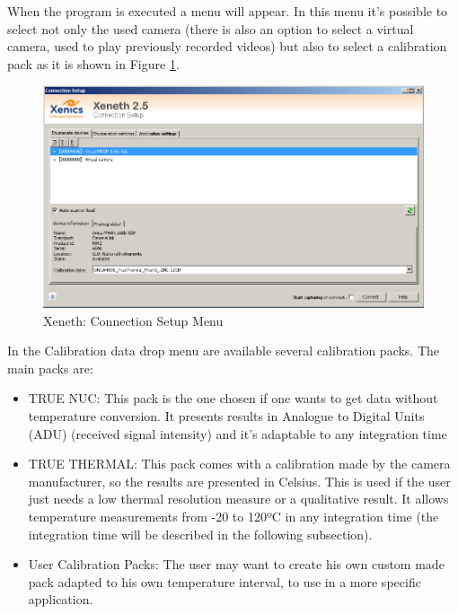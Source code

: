 \par When the program is executed a menu will appear. In this menu it's possible to select not only the used camera (there is also an option to select a virtual camera, used to play previously recorded videos) but also to select a calibration pack as it is shown in Figure \ref{fig:consetup}.
\begin{figure}[h]
\centering
\includegraphics[width=0.7\linewidth]{Figures/3.Chapter/xeneth1.png}
\caption{Xeneth: Connection Setup Menu}
\label{fig:consetup}
\end{figure}
\par In the Calibration data drop menu are available several calibration packs. The main packs are:
\begin{itemize}
\item TRUE NUC: This pack is the one chosen if one wants to get data without temperature conversion. It presents results in Analogue to Digital Units (ADU) (received signal intensity) and it's adaptable to any integration time
\item TRUE THERMAL: This pack comes with a calibration made by the camera manufacturer, so the results are presented in Celsius. This is used if the user just needs a low thermal resolution measure or a qualitative result. It allows temperature measurements from -20 to 120ºC in any integration time (the integration time will be described in the following subsection).
\item User Calibration Packs: The user may want to create his own custom made pack adapted to his own temperature interval, to use in a more specific application.
\end{itemize}

